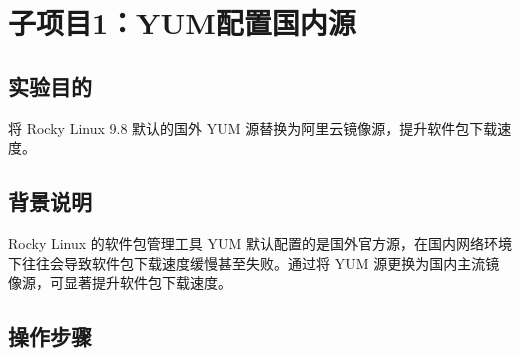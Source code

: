 \documentclass[12pt,a4paper]{ctexart}
\begin{document}
\section{子项目1：YUM配置国内源}

\subsection{实验目的}

将 Rocky Linux 9.8 默认的国外 YUM 源替换为阿里云镜像源，提升软件包下载速度。

\subsection{背景说明}

Rocky Linux 的软件包管理工具 YUM 默认配置的是国外官方源，在国内网络环境下往往会导致软件包下载速度缓慢甚至失败。通过将 YUM 源更换为国内主流镜像源，可显著提升软件包下载速度。

\subsection{操作步骤}
\end{document}
